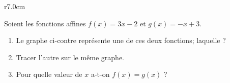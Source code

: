 
\begin{exercice}\label{exosmath-0569}

\begin{wrapfigure}{r}{7.0cm}
   \vspace{-2.5cm}        %
   \centering
   
\end{wrapfigure}

    Soient les fonctions affines \( f(x)=3x-2\) et \( g(x)=-x+3\). 
    \begin{enumerate}
        \item
            Le graphe ci-contre représente une de ces deux fonctions; laquelle ?
        \item
            Tracer l'autre sur le même graphe.
        \item
            Pour quelle valeur de \( x\) a-t-on \( f(x)=g(x)\) ? 
    \end{enumerate}

\end{exercice}
